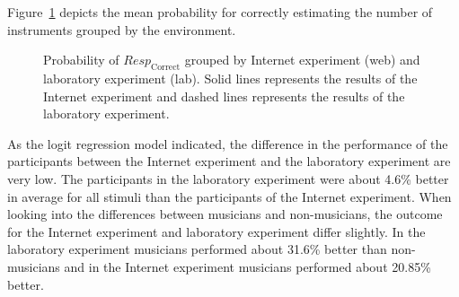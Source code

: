 Figure~\ref{figure:error_probability_iis_vs_web} depicts the mean probability for correctly estimating the number of instruments grouped by the environment. 
\begin{figure}[t]
\centering
{}
\caption{Probability of $\textit{Resp}_{\mathrm{Correct}}$ grouped by Internet experiment (web) and laboratory experiment (lab). Solid lines represents the results of the Internet experiment and dashed lines represents the results of the laboratory experiment.}
\label{figure:error_probability_iis_vs_web}
\end{figure}
As the logit regression model indicated, the difference in the performance of the participants between the Internet experiment and the laboratory experiment are very low. The participants in the laboratory experiment were about 4.6\% better in average for all stimuli than the participants of the Internet experiment. When looking into the differences between musicians and non-musicians, the outcome for the Internet experiment and laboratory experiment differ slightly. In the laboratory experiment musicians performed about 31.6\% better than non-musicians and in the Internet experiment musicians performed about 20.85\% better.
